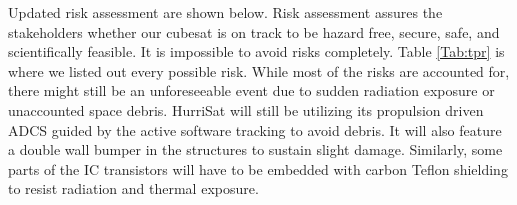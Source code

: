 \begin{table}[hbt!]
\caption{Risk Color-grading}
\label{Tab:rcg}
\centering
{}
\end{table}
\vspace{1cm}
Updated risk assessment are shown below. Risk assessment assures the stakeholders whether our cubesat  is on track to be hazard free, secure, safe, and scientifically feasible. It is impossible to avoid risks completely. 
Table \ref{Tab:tpr} is where we listed out every possible risk. While most of the risks are accounted for, there might still be an unforeseeable event due to sudden radiation exposure or unaccounted space debris. HurriSat will still be utilizing its propulsion driven ADCS guided by the active software tracking to avoid debris. It will also feature a double wall bumper in the structures to sustain slight damage. Similarly, some parts of the IC transistors will have to be embedded with carbon Teflon shielding to resist radiation and thermal exposure.\\


